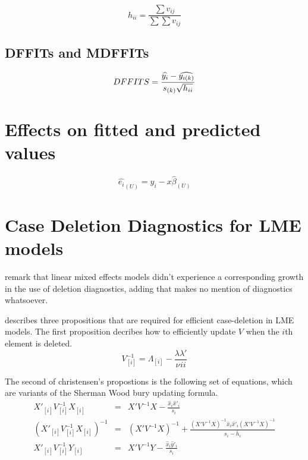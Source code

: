 \documentclass[12pt, a4paper]{report}
\theoremstyle{plain}
\theoremstyle{definition}
\theoremstyle{remark}
\begin{document}
\[ h_{ii} = \frac{\sum v_{ij}}{\sum \sum v_{ij}} \]



\subsection{DFFITs and MDFFITs}

\begin{displaymath} DFFITS = {\widehat{y_i} -
	\widehat{y_{i(k)}} \over s_{(k)} \sqrt{h_{ii}}} \end{displaymath}





\section{Effects on fitted and predicted values}
\begin{equation}
\hat{e_{i}}_{(U)} = y_{i} - x\hat{\beta}_{(U)}
\end{equation}




	\section{Case Deletion Diagnostics for LME models}
	
	\citet{HaslettDillane} remark that linear mixed effects models
	didn't experience a corresponding growth in the use of deletion
	diagnostics, adding that \citet{McCullSearle} makes no mention of
	diagnostics whatsoever.
	
	\citet{Christensen} describes three propositions that are required
	for efficient case-deletion in LME models. The first proposition
	decribes how to efficiently update $V$ when the $i$th element is
	deleted.
	\begin{equation}
	V_{[i]}^{-1} = \Lambda_{[i]} - \frac{\lambda
		\lambda\prime}{\nu^{}ii}
	\end{equation}
	
	
	The second of christensen's propostions is the following set of
	equations, which are variants of the Sherman Wood bury updating
	formula.
	\begin{eqnarray}
	X'_{[i]}V_{[i]}^{-1}X_{[i]} &=& X' V^{-1}X -
	\frac{\hat{x}_{i}\hat{x}'_{i}}{s_{i}}\\
	(X'_{[i]}V_{[i]}^{-1}X_{[i]})^{-1} &=& (X' V^{-1}X)^{-1} +
	\frac{(X' V^{-1}X)^{-1}\hat{x}_{i}\hat{x}' _{i}
		(X' V^{-1}X)^{-1}}{s_{i}- \bar{h}_{i}}\\
	X'_{[i]}V_{[i]}^{-1}Y_{[i]} &=& X\prime V^{-1}Y -
	\frac{\hat{x}_{i}\hat{y}' _{i}}{s_{i}}
	\end{eqnarray}
	
\end{document}
